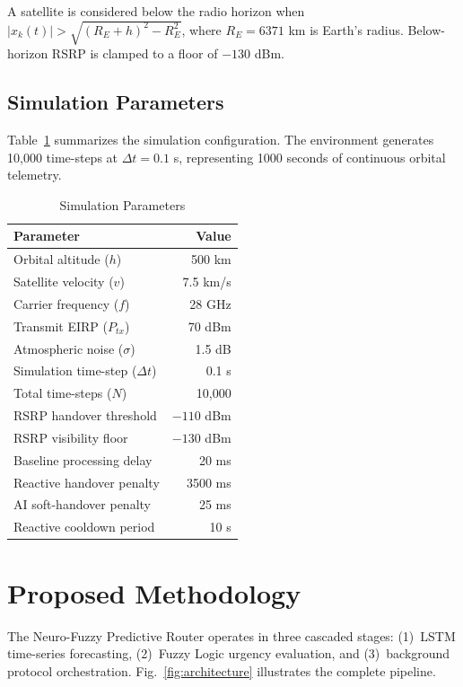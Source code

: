 \documentclass[conference]{IEEEtran}
\begin{document}
A satellite is considered below the radio horizon when $|x_k(t)| > \sqrt{(R_E + h)^2 - R_E^2}$, where $R_E = 6371$ km is Earth's radius. Below-horizon RSRP is clamped to a floor of $-130$ dBm.

\subsection{Simulation Parameters}

Table~\ref{tab:params} summarizes the simulation configuration. The environment generates 10,000 time-steps at $\Delta t = 0.1$ s, representing 1000 seconds of continuous orbital telemetry.

\begin{table}[htbp]
\caption{Simulation Parameters}
\label{tab:params}
\centering
\begin{tabular}{l r}
\toprule
\textbf{Parameter} & \textbf{Value} \\
\midrule
Orbital altitude ($h$) & 500 km \\
Satellite velocity ($v$) & 7.5 km/s \\
Carrier frequency ($f$) & 28 GHz \\
Transmit EIRP ($P_{tx}$) & 70 dBm \\
Atmospheric noise ($\sigma$) & 1.5 dB \\
Simulation time-step ($\Delta t$) & 0.1 s \\
Total time-steps ($N$) & 10,000 \\
RSRP handover threshold & $-110$ dBm \\
RSRP visibility floor & $-130$ dBm \\
Baseline processing delay & 20 ms \\
Reactive handover penalty & 3500 ms \\
AI soft-handover penalty & 25 ms \\
Reactive cooldown period & 10 s \\
\bottomrule
\end{tabular}
\end{table}

\section{Proposed Methodology}

The Neuro-Fuzzy Predictive Router operates in three cascaded stages: (1)~LSTM time-series forecasting, (2)~Fuzzy Logic urgency evaluation, and (3)~background protocol orchestration. Fig.~\ref{fig:architecture} illustrates the complete pipeline.
\end{document}
